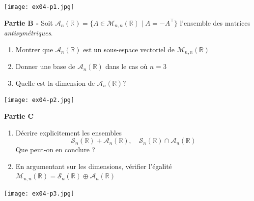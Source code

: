 \documentclass[a4paper, 10pt]{report}
\begin{document}
	\texttt{[image: ex04-p1.jpg]}
	
	\textbf{Partie B -} Soit $\mathcal{A}_n(\mathbb{R})
	= \{A \in \mathcal{M}_{n, n}(\mathbb{R}) \mid A = -A^{\top}\}$
	l'ensemble des matrices \textit{antisymétriques}.
	\begin{enumerate}[label=\arabic*.]
		\item Montrer que $\mathcal{A}_n(\mathbb{R})$ est un sous-espace
		vectoriel de $\mathcal{M}_{n, n}(\mathbb{R})$
		\item Donner une base de $\mathcal{A}_n(\mathbb{R})$ dans le cas
		où $n = 3$
		\item Quelle est la dimension de $\mathcal{A}_n(\mathbb{R})$?
		\\
	\end{enumerate}
	
	\texttt{[image: ex04-p2.jpg]}
		
	\textbf{Partie C}
	\begin{enumerate}[label=\arabic*.]
		\item Décrire explicitement les ensembles
		\[
			\mathcal{S}_n(\mathbb{R}) + \mathcal{A}_n(\mathbb{R}),
			\quad
			\mathcal{S}_n(\mathbb{R}) \cap \mathcal{A}_n(\mathbb{R})
		\]
		Que peut-on en conclure ?
		\item En argumentant sur les dimensions, vérifier l'égalité
		$\mathcal{M}_{n, n}(\mathbb{R}) =
			\mathcal{S}_n(\mathbb{R}) \oplus \mathcal{A}_n(\mathbb{R})$
	\end{enumerate}
	
	\texttt{[image: ex04-p3.jpg]}	
	
%	
%	
	
\end{document}
